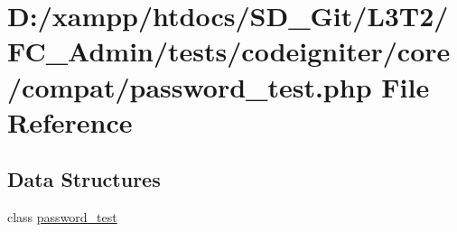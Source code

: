 \hypertarget{password__test_8php}{}\section{D\+:/xampp/htdocs/\+S\+D\+\_\+\+Git/\+L3\+T2/\+F\+C\+\_\+\+Admin/tests/codeigniter/core/compat/password\+\_\+test.php File Reference}
\label{password__test_8php}
\subsection*{Data Structures}
\begin{DoxyCompactItemize}
\item 
class \hyperlink{classpassword__test}{password\+\_\+test}
\end{DoxyCompactItemize}
